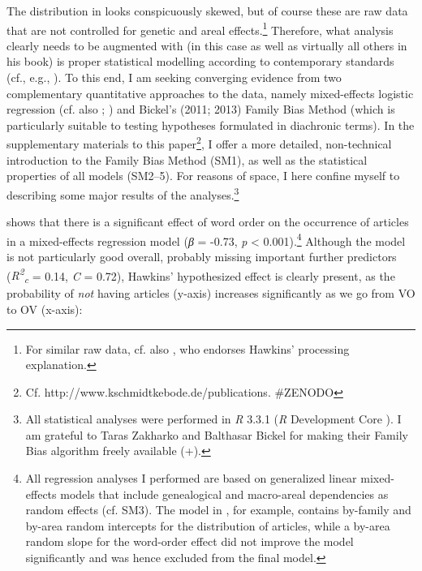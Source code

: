 \documentclass[output=paper]{langsci/langscibook}
\begin{document}
The distribution in  looks conspicuously skewed, but of course these are raw data that are not controlled for genetic and areal effects.\footnote{For similar raw data, cf. also \citet{Dryer2009}, who endorses Hawkins’ processing explanation.} Therefore, what  analysis clearly needs to be augmented with (in this case as well as virtually all others in his book) is proper statistical modelling according to contemporary standards (cf., e.g., \citealt{Bickel2011}). To this end, I am seeking converging evidence from two complementary quantitative approaches to the data, namely mixed-effects logistic regression (cf. also \citealt{Cysouw2010}; \citealt{JaegerEtAl2011}) and Bickel’s (2011; 2013) Family Bias Method (which is particularly suitable to testing hypotheses formulated in diachronic terms). In the supplementary materials to this paper\footnote{Cf. http://www.kschmidtkebode.de/publications. \#ZENODO}, I offer a more detailed, non-technical introduction to the Family Bias Method (SM1), as well as the statistical properties of all models (SM2–5). For reasons of space, I here confine myself to describing some major results of the analyses.\footnote{All statistical analyses were performed in \textit{R} 3.3.1 (\textit{R} Development Core \citealt{Team2016}). I am grateful to Taras Zakharko and Balthasar Bickel for making their Family Bias algorithm freely available (\citealt{ZakharkoBickel2011}+).}

 shows that there is a significant effect of word order on the occurrence of articles in a mixed-effects regression model (\textit{β} = -0.73, \textit{p} < 0.001).\footnote{All regression analyses I performed are based on generalized linear mixed-effects models that include genealogical and macro-areal dependencies as random effects (cf. SM3). The model in , for example, contains by-family and by-area random intercepts for the distribution of articles, while a by-area random slope for the word-order effect did not improve the model significantly and was hence excluded from the final model.} Although the model is not particularly good overall, probably missing important further predictors (\textit{R\textsuperscript{2}}\textit{\textsubscript{c}} = 0.14, \textit{C} = 0.72), Hawkins’ hypothesized effect is clearly present, as the probability of \textit{not} having articles (y-axis) increases significantly as we go from VO to OV (x-axis):

  
\end{document}
